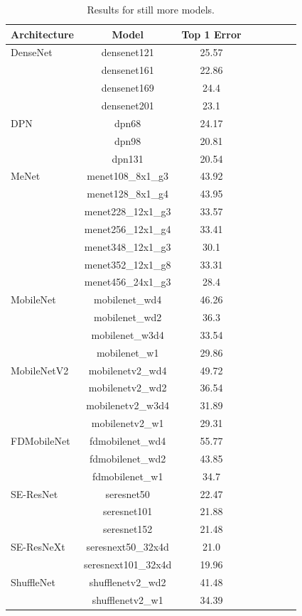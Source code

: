 \begin{table}[!htb]
\small
\begin{center}
\begin{tabular}{|p{1in}|c|c|c|c|c|c|c|}
\hline
Architecture 
 & Model
 & Top 1 Error \\
 \hline
 DenseNet & densenet121 & 25.57 & \\
& densenet161 & 22.86 & \\
& densenet169 & 24.4 & \\
& densenet201 & 23.1 & \\\hline
DPN & dpn68 & 24.17 & \\
& dpn98 & 20.81 & \\
& dpn131 & 20.54 & \\
\hline
MeNet & menet108\_8x1\_g3 & 43.92 & \\
& menet128\_8x1\_g4 & 43.95 & \\
& menet228\_12x1\_g3 & 33.57 & \\
& menet256\_12x1\_g4 & 33.41 & \\
& menet348\_12x1\_g3 & 30.1 & \\
& menet352\_12x1\_g8 & 33.31 & \\
& menet456\_24x1\_g3 & 28.4 & \\
\hline
MobileNet & mobilenet\_wd4 & 46.26 & \\
& mobilenet\_wd2 & 36.3 & \\
& mobilenet\_w3d4 & 33.54 & \\
& mobilenet\_w1 & 29.86 & \\
\hline
MobileNetV2 & mobilenetv2\_wd4 & 49.72 & \\
& mobilenetv2\_wd2 & 36.54 & \\
& mobilenetv2\_w3d4 & 31.89 & \\
& mobilenetv2\_w1 & 29.31 & \\
\hline
FDMobileNet & fdmobilenet\_wd4 & 55.77 & \\
& fdmobilenet\_wd2 & 43.85 & \\
& fdmobilenet\_w1 & 34.7 & \\
\hline
SE-ResNet & seresnet50 & 22.47 & \\
& seresnet101 & 21.88 & \\
& seresnet152 & 21.48 & \\
\hline
SE-ResNeXt & seresnext50\_32x4d & 21.0 & \\
& seresnext101\_32x4d & 19.96 & \\
\hline
ShuffleNet & shufflenetv2\_wd2 & 41.48 & \\
& shufflenetv2\_w1 & 34.39 & \\
\hline
\end{tabular}
\end{center}
\caption{Results for still more models.
        }
\label{table:models_still_more}
\end{table}


